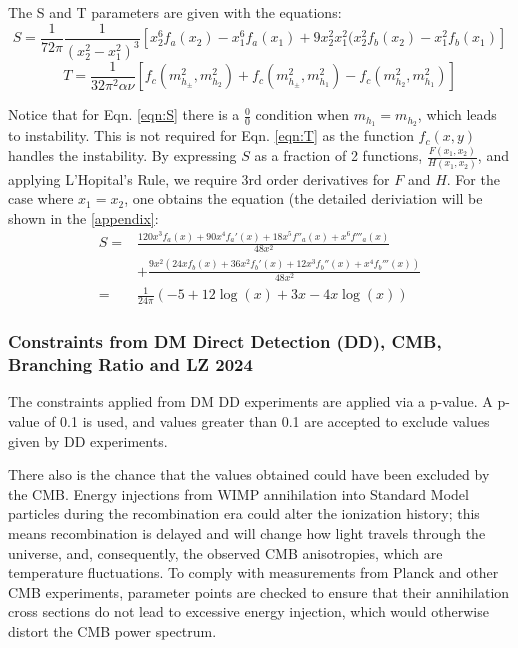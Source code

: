 \documentclass[12pt]{article}
\begin{document}
The S and T parameters are given \cite{Belyaev:2016lok} with the equations:
\begin{equation}
           S = \frac{1}{72\pi}\frac{1}{(x^2_2 - x^2_1)^3}[x^6_2f_a(x_2)-x^6_1f_a(x_1)+ 9x_2^2x_1^2(x_2^2f_b(x_2)-x^2_1f_b(x_1)] 
    \label{eqn:S}
\end{equation}
\begin{equation}
        T = \frac{1}{32\pi^2\alpha\nu}[f_c(m^2_{h_\pm},m^2_{h_2})
            + f_c(m^2_{h_\pm},m^2_{h_1}) - f_c(m^2_{h_2},m^2_{h_1})]
    \label{eqn:T}
\end{equation}

Notice that for Eqn. \ref{eqn:S} there is a $\frac{0}{0}$ condition when $m_{h_1} = m_{h_2}$, which leads to instability. This is not required for Eqn. \ref{eqn:T} as the function $f_c(x, y)$ handles the instability. By expressing $S$ as a fraction of 2 functions, $\frac{F(x_1, x_2)}{H(x_1, x_2)}$, and applying L'Hopital's Rule, we require 3rd order derivatives for $F$ and $H$. For the case where $x_1 = x_2$, one obtains the equation (the detailed deriviation will be shown in the \ref{appendix}: 
\begin{equation}
    \begin{split}
        S =& \frac{120 x^3f_a(x) + 90 x^4f_a'(x)+18x^5f''_a(x)+x^6f'''_a(x)}{48x^2} \\&+\frac{9x^2\left(24xf_b(x) + 36x^2f_b'(x)+12x^3f_b''(x) + x^4f_b'''(x)\right)}{48x^2}
        \\ =& \frac{1}{24\pi}\left(-5 + 12\log(x) + 3x - 4x\log(x)\right)
    \end{split}
    \label{eqn:S_hopital}
\end{equation}

\subsubsection{Constraints from DM Direct Detection (DD), CMB, Branching Ratio and LZ 2024}
The constraints applied from DM DD experiments are applied via a p-value. A p-value of 0.1 is used, and values greater than 0.1 are accepted to exclude values given by DD experiments.

There also is the chance that the values obtained could have been excluded by the CMB. Energy injections from WIMP annihilation into Standard Model particles during the recombination era could alter the ionization history; this means recombination is delayed and will change how light travels through the universe, and, consequently, the observed CMB anisotropies, which are temperature fluctuations. To comply with measurements from Planck and other CMB experiments, parameter points are checked to ensure that their annihilation cross sections do not lead to excessive energy injection, which would otherwise distort the CMB power spectrum. 
\end{document}

